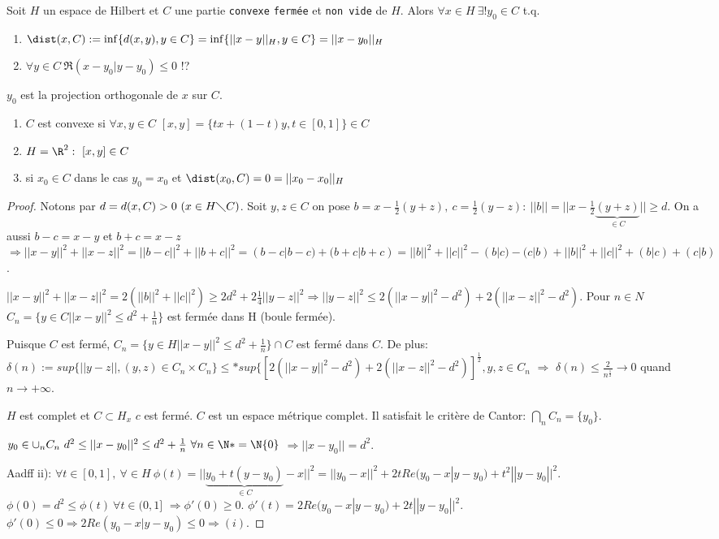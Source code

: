 \begin{theorem}
	Soit $H$ un espace de Hilbert et $C$ une partie \texttt{convexe} \texttt{fermée} et \texttt{non vide} de $H$. Alors $\forall x\in H\ \exists ! y_0\in C$ t.q.
	\begin{enumerate}
		\item $\dist(x, C):=\inf\{d(x,y), y\in C\}=\inf\{||x-y||_H, y\in C\} = ||x-y_0||_H$
		\item $\forall y\in C\ \Re(x-y_0| y-y_0)\leq 0$ !?
	\end{enumerate} 
	$y_0$ est la projection orthogonale de $x$ sur $C$.
	
\end{theorem}


\begin{remark}
	\leavevmode
	\begin{enumerate}
		\item $C$ est convexe si $\forall x, y \in C$ $[x,y]=\{tx+(1-t)y, t\in[0,1]\}\in C$
		\item $H=\R^2:\ [x,y]\in C$
		\item si $x_0\in C$ dans le cas $y_0=x_0$ et $\dist(x_0, C)=0=||x_0-x_0||_H$
	\end{enumerate}
\end{remark}





\begin{proof}
	Notons par $d=d(x,C)>0\ (x\in H\diagdown C)$. Soit $y, z\in C$ on pose $b=x-\frac12(y+z),\ c=\frac12(y-z):\ ||b||=||x-\frac12\underbrace{(y+z)}_{\in C}||\geq d$. On a aussi $b-c=x-y$ et $b+c=x-z$ $\Rightarrow ||x-y||^2+||x-z||^2=||b-c||^2+||b+c||^2=(b-c| b-c)+(b+c|b+c)=||b||^2+||c||^2-(b|c)-(c|b)+||b||^2+||c||^2 + (b|c)+(c|b)$.
	
	$||x-y||^2+||x-z||^2=2(||b||^2+||c||^2)\geq 2 d^2+2\frac14||y-z||^2 \Rightarrow ||y-z||^2\leq 2(||x-y||^2-d^2)+2(||x-z||^2-d^2)$. Pour $n\in N$ $C_n=\{y\in C ||x-y||^2\leq d^2+\frac1n\}$ est fermée dans H (boule fermée).
	
	Puisque $C$ est fermé, $C_n=\{y\in H ||x-y||^2\leq d^2+\frac1n\}\cap C$ est fermé dans $C$.
	De plus: $\delta (n):=sup\{||y-z||, (y,z)\in C_n\times C_n\}\leq * sup\{[2(||x-y||^2-d^2)+2(||x-z||^2-d^2)]^\frac12, y,z\in C_n$ $\Rightarrow$ $\delta (n)\leq \frac2{n^\frac12}\to 0$ quand $n\to +\infty$.

$H$ est complet et $C\subset H_x$ $c$ est fermé. $C$ est un espace métrique complet. Il satisfait le critère de Cantor: $\bigcap\limits_n C_n=\{y_0\}$.


$y_0\in\cup_n C_n\ d^2\leq ||x-y_0||^2\leq d^2+\frac1n\ \forall n\in\N*=\N\\\{0\}$
$\Rightarrow ||x-y_0||=d^2$.

Aadff ii): $\forall t\in[0,1],\ \forall\in H\ \phi(t)=||\underbrace{y_0+t(y-y_0)}_{\in C}-x||^2 = ||y_0-x||^2+2tRe(y_0-x|y-y_0)+t^2||y-y_0||^2$. $\phi(0)=d^2\leq \phi(t)\ \forall t\in(0,1]$ $\Rightarrow \phi'(0)\geq 0$. $\phi'(t)=2Re(y_0-x|y-y_0)+2t||y-y_0||^2$. $\phi'(0)\leq 0 \Rightarrow 2Re(y_0-x|y-y_0)\leq 0\Rightarrow (i)$.

\end{proof}


